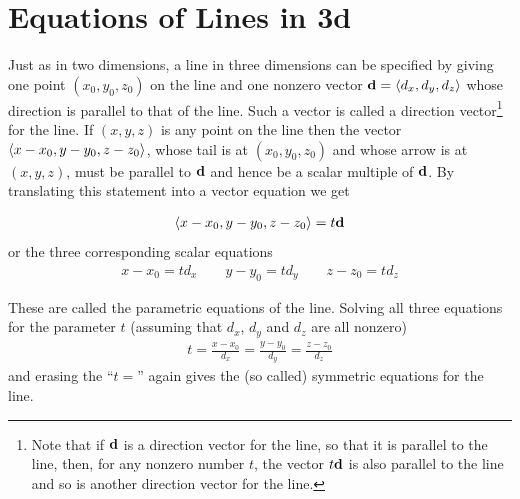 \section{Equations of Lines in 3d}\label{sec lines 3d}
Just as in two dimensions, a line in three dimensions can be specified  by
giving one point $(x_0,y_0,z_0)$ on the line and one nonzero vector 
$\mathbf{d}=\left< d_x,d_y,d_z\right> $ whose direction is parallel to that of the line.
Such a vector is called a direction vector\footnote{Note that if $\mathbf{d}$ is a direction vector for the line, so that it is parallel to the line, then, for any nonzero number $t$, the vector $t\mathbf{d}$ is also parallel to the line and so is another direction vector for the line.} for the line.
If $(x,y,z)$ is any point on the line then the vector $\left< x-x_0,y-y_0,z-z_0\right> $,
whose tail is at $(x_0,y_0,z_0)$ and whose arrow is at $(x,y,z)$,  must be
parallel to $\mathbf{d}$ and hence be a scalar multiple of $\mathbf{d}$. By translating
this statement into a vector equation we get
\begin{impeqn}\label{par eqn of line}
\begin{align*}
\left< x-x_0,y-y_0,z-z_0\right> =t \mathbf{d}
\end{align*}
or the three corresponding scalar equations
\begin{align*}
x-x_0 = t d_x\qquad
y-y_0 = t d_y\qquad
z-z_0 = t d_z
\end{align*}
\end{impeqn}\noindent
These are called the parametric equations of the line.
Solving all three equations for the parameter $t$ (assuming that $d_x$, $d_y$ and $d_z$ are all nonzero)
\begin{align*}
t=\frac{x-x_0}{d_x}=\frac{y-y_0}{d_y}=\frac{z-z_0}{d_z}
\end{align*}
and erasing the ``$t=$'' again gives the (so called) symmetric 
equations for the line. 

